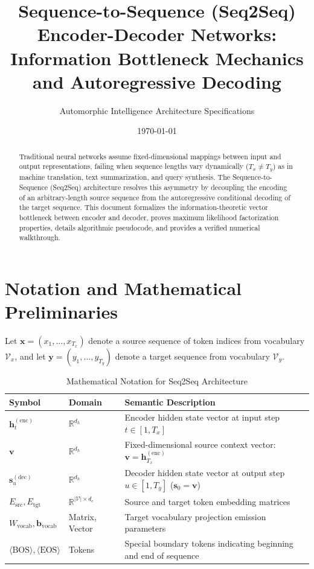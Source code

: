 \documentclass[11pt,a4paper]{article}
\title{Sequence-to-Sequence (Seq2Seq) Encoder-Decoder Networks: Information Bottleneck Mechanics and Autoregressive Decoding}
\author{Automorphic Intelligence Architecture Specifications}
\date{\today}
\theoremstyle{definition}
\begin{document}
\maketitle

\begin{abstract}
Traditional neural networks assume fixed-dimensional mappings between input and output representations, failing when sequence lengths vary dynamically ($T_x \ne T_y$) as in machine translation, text summarization, and query synthesis. The Sequence-to-Sequence (Seq2Seq) architecture resolves this asymmetry by decoupling the encoding of an arbitrary-length source sequence from the autoregressive conditional decoding of the target sequence. This document formalizes the information-theoretic vector bottleneck between encoder and decoder, proves maximum likelihood factorization properties, details algorithmic pseudocode, and provides a verified numerical walkthrough.
\end{abstract}

\section{Notation and Mathematical Preliminaries}

Let $\mathbf{x} = (x_1, \dots, x_{T_x})$ denote a source sequence of token indices from vocabulary $\mathcal{V}_x$, and let $\mathbf{y} = (y_1, \dots, y_{T_y})$ denote a target sequence from vocabulary $\mathcal{V}_y$.

\begin{table}[h]
\centering
\caption{Mathematical Notation for Seq2Seq Architecture}
\begin{tabular}{lll}
\toprule
\textbf{Symbol} & \textbf{Domain} & \textbf{Semantic Description} \\
\midrule
$\mathbf{h}_t^{(\text{enc})}$ & $\mathbb{R}^{d_h}$ & Encoder hidden state vector at input step $t \in [1, T_x]$ \\
$\mathbf{v}$ & $\mathbb{R}^{d_h}$ & Fixed-dimensional source context vector: $\mathbf{v} = \mathbf{h}_{T_x}^{(\text{enc})}$ \\
$\mathbf{s}_u^{(\text{dec})}$ & $\mathbb{R}^{d_h}$ & Decoder hidden state vector at output step $u \in [1, T_y]$ ($\mathbf{s}_0 = \mathbf{v}$) \\
$E_{\text{src}}, E_{\text{tgt}}$ & $\mathbb{R}^{|\mathcal{V}| \times d_e}$ & Source and target token embedding matrices \\
$W_{\text{vocab}}, \mathbf{b}_{\text{vocab}}$ & Matrix, Vector & Target vocabulary projection emission parameters \\
$\langle \text{BOS} \rangle, \langle \text{EOS} \rangle$ & Tokens & Special boundary tokens indicating beginning and end of sequence \\
\bottomrule
\end{tabular}
\end{table}
\end{document}

